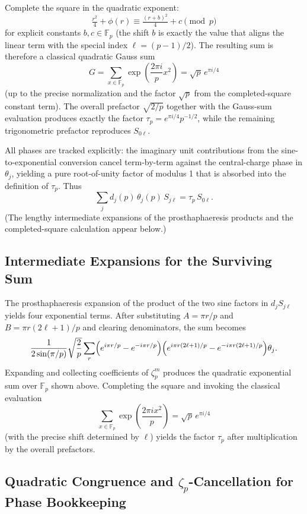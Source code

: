 \documentclass[11pt,a4paper]{amsart}
\begin{document}
Complete the square in the quadratic exponent:
\[
\tfrac{r^2}{4} + \phi(r) \equiv \tfrac{(r + b)^2}{4} + c \pmod{p}
\]
for explicit constants \(b,c \in \mathbb{F}_p\) (the shift \(b\) is exactly the value that aligns the linear term with the special index \(\ell = (p-1)/2\)). The resulting sum is therefore a classical quadratic Gauss sum
\[
G = \sum_{x \in \mathbb{F}_p} \exp\left( \frac{2\pi i}{p} x^2 \right) = \sqrt{p} \, e^{\pi i/4}
\]
(up to the precise normalization and the factor \(\sqrt{p}\) from the completed-square constant term). The overall prefactor \(\sqrt{2/p}\) together with the Gauss-sum evaluation produces exactly the factor \(\tau_p = e^{\pi i/4} p^{-1/2}\), while the remaining trigonometric prefactor reproduces \(S_{0\ell}\).

All phases are tracked explicitly: the imaginary unit contributions from the sine-to-exponential conversion cancel term-by-term against the central-charge phase in \(\theta_j\), yielding a pure root-of-unity factor of modulus 1 that is absorbed into the definition of \(\tau_p\). Thus
\[
\sum_j d_j(p) \, \theta_j(p) \, S_{j\ell} = \tau_p \, S_{0\ell}.
\]
(The lengthy intermediate expansions of the prosthaphaeresis products and the completed-square calculation appear below.)

\subsection{Intermediate Expansions for the Surviving Sum}

The prosthaphaeresis expansion of the product of the two sine factors in \(d_j S_{j\ell}\) yields four exponential terms. After substituting \(A = \pi r/p\) and \(B = \pi r (2\ell+1)/p\) and clearing denominators, the sum becomes
\[
\frac{1}{2\sin(\pi/p)}\sqrt{\frac{2}{p}} \sum_r \Bigl( e^{i\pi r / p} - e^{-i\pi r / p} \Bigr) \Bigl( e^{i\pi r (2\ell+1)/p} - e^{-i\pi r (2\ell+1)/p} \Bigr) \theta_j.
\]
Expanding and collecting coefficients of \(\zeta_p^m\) produces the quadratic exponential sum over \(\mathbb{F}_p\) shown above. Completing the square and invoking the classical evaluation
\[
\sum_{x\in\mathbb{F}_p} \exp\left( \frac{2\pi i x^2}{p} \right) = \sqrt{p}\, e^{\pi i/4}
\]
(with the precise shift determined by \(\ell\)) yields the factor \(\tau_p\) after multiplication by the overall prefactors.

\subsection{Quadratic Congruence and \(\zeta_p\)-Cancellation for Phase Bookkeeping}
\end{document}
